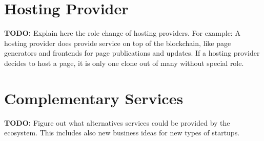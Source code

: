 
\section{Hosting Provider}

\textbf{TODO:} Explain here the role change of hosting providers. For example:
A hosting provider does provide service on top of the blockchain, like page
generators and frontends for page publications and updates. If a hosting
provider decides to host a page, it is only one clone out of many without
special role.

\section{Complementary Services}

\textbf{TODO:} Figure out what alternatives services could be provided by the
ecosystem. This includes also new business ideas for new types of startups.
